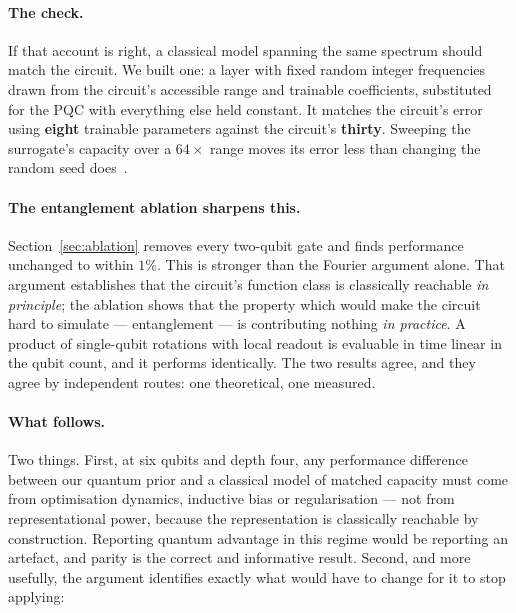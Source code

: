 \documentclass[11pt,onecolumn]{article}
\begin{document}
\paragraph{The check.}
If that account is right, a classical model spanning the same spectrum
should match the circuit. We built one: a layer with fixed random
integer frequencies drawn from the circuit's accessible range and
trainable coefficients, substituted for the PQC with everything else
held constant. It matches the circuit's error using \textbf{eight}
trainable parameters against the circuit's \textbf{thirty}. Sweeping the
surrogate's capacity over a $64\times$ range moves its error less than
changing the random seed does~\cite{papera}.

\paragraph{The entanglement ablation sharpens this.}
Section~\ref{sec:ablation} removes every two-qubit gate and finds
performance unchanged to within $1\%$. This is stronger than the Fourier
argument alone. That argument establishes that the circuit's function
class is classically reachable \emph{in principle}; the ablation shows
that the property which would make the circuit hard to simulate ---
entanglement --- is contributing nothing \emph{in practice}. A product
of single-qubit rotations with local readout is evaluable in time linear
in the qubit count, and it performs identically. The two results agree,
and they agree by independent routes: one theoretical, one measured.

\paragraph{What follows.}
Two things. First, at six qubits and depth four, any performance
difference between our quantum prior and a classical model of matched
capacity must come from optimisation dynamics, inductive bias or
regularisation --- not from representational power, because the
representation is classically reachable by construction. Reporting
quantum advantage in this regime would be reporting an artefact, and
parity is the correct and informative result. Second, and more usefully,
the argument identifies exactly what would have to change for it to
stop applying:
\end{document}
